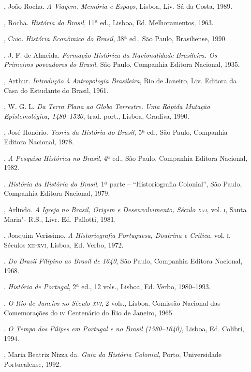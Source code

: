 \begin{bibliohedra}
, João Rocha. \textit{A Viagem, Memória e Espaço}, Lisboa, Liv.
Sá da Costa, 1989.

, Rocha. \textit{História do Brasil}, 11ª ed., Lisboa, Ed.
Melhoramentos, 1963.

, Caio. \textit{História Econômica do Brasil}, 38ª ed.,
São Paulo, Brasiliense, 1990.

, J. F. de Almeida. \textit{Formação Histórica da Nacionalidade
Brasileira. Os Primeiros povoadores do Brasil}, São Paulo, Companhia
Editora Nacional, 1935.

, Arthur. \textit{Introdução à Antropologia Brasileira}, Rio de
Janeiro, Liv. Editora da Casa do Estudante do Brasil, 1961.

, W. G. L. \textit{Da Terra Plana ao Globo Terrestre. Uma
Rápida Mutação Epistemológica, 1480--1520}, trad. port., Lisboa, Gradiva, 1990.

, José Honório. \textit{Teoria da História do Brasil}, 5ª
ed., São Paulo, Companhia Editora Nacional, 1978.

\titidem. \textit{A Pesquisa Histórica no Brasil}, 4ª
ed., São Paulo, Companhia Editora Nacional, 1982.

\titidem. \textit{História da História do Brasil}, 1ª
parte -- ``Historiografia Colonial'', São Paulo, Companhia Editora
Nacional, 1979.

, Arlindo. \textit{A Igreja no Brasil, Origem e Desenvolvimento,
Século \textsc{xvi}}, vol. \textsc{i}, Santa Maria"- R.S., Livr. Ed. Pallotti, 1981.

, Joaquim Veríssimo. \textit{A Historiografia Portuguesa,
Doutrina e Crítica}, vol. \textsc{i}, Séculos \textsc{xii}-\textsc{xvi}, Lisboa, Ed. Verbo, 1972.

\titidem. \textit{Do Brasil Filipino ao Brasil de
1640}, São Paulo, Companhia Editora Nacional, 1968.

\titidem. \textit{História de Portugal}, 2ª ed., 12
vols., Lisboa, Ed. Verbo, 1980--1993.

\titidem. \textit{O Rio de Janeiro no Século \textsc{xvi}}, 2
vols., Lisboa, Comissão Nacional das Comemorações do \textsc{iv} Centenário do
Rio de Janeiro, 1965. 

\titidem. \textit{O Tempo dos Filipes em Portugal e no
Brasil (1580--1640)}, Lisboa, Ed. Colibri, 1994.

, Maria Beatriz Nizza da. \textit{Guia da História Colonial}, 
Porto, Universidade Portucalense, 1992.


\end{bibliohedra}
